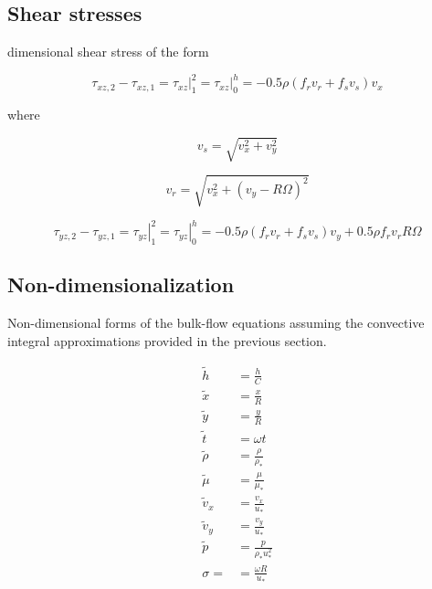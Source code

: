 \documentclass[12pt,letterpaper]{article}
\newcommand*{\nd}[1]{\tilde{#1}} %
\newcommand*{\scale}[1]{{#1}_*} %
\begin{document}

\subsection{Shear stresses}

dimensional shear stress of the form

\begin{equation}
\tau_{xz,2} - \tau_{xz,1} = \left. \tau_{xz} \right|_1^2 = \left. \tau_{xz} \right|_0^h = -0.5 \rho \left( f_r v_r + f_s v_s \right) v_x
\end{equation}

where

\begin{equation} 
v_s = \sqrt{v_x^2 + v_y^2}
\end{equation}

\begin{equation} 
v_r =  \sqrt{v_x^2 + \left( v_y - R \Omega \right)^2 }
\end{equation}

\begin{equation}
\tau_{yz,2} - \tau_{yz,1} = \left. \tau_{yz} \right|_1^2 = 
\left. \tau_{yz} \right|_0^h = 
-0.5 \rho \left( 
f_r v_r + f_s v_s \right) v_y + 
0.5 \rho f_r v_r R\Omega
\end{equation}


\subsection{Non-dimensionalization}

Non-dimensional forms of the bulk-flow equations assuming the convective
integral approximations provided in the previous section.

\begin{align*}
\nd{h} &= \frac{h}{C}\\
\nd{x} &= \frac{x}{R}\\
\nd{y} &= \frac{y}{R}\\
\nd{t} &= \omega t\\
\nd{\rho} &= \frac{\rho}{\scale{\rho}}\\
\nd{\mu} &= \frac{\mu}{\scale{\mu}}\\
\nd{v}_x &= \frac{v_x}{\scale{u}}\\
\nd{v}_y &= \frac{v_y}{\scale{u}}\\
\nd{p} &= \frac{p}{\scale{\rho} \scale{u}^2} \\
\sigma = &= \frac{ \omega R}{\scale{u}}
\end{align*}
\end{document}
